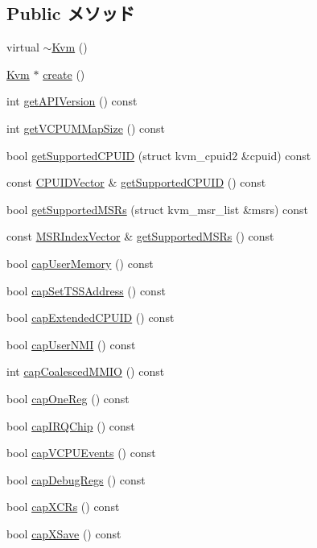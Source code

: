 \subsection*{Public メソッド}
\begin{DoxyCompactItemize}
\item 
virtual \hyperlink{classKvm_af634ce04aefb47ce4de9d029a9bc0642}{$\sim$Kvm} ()
\item 
\hyperlink{classKvm}{Kvm} $\ast$ \hyperlink{classKvm_a5a41f15f5b11ddab46bb5622409aea52}{create} ()
\item 
int \hyperlink{classKvm_a5bbf835d489e2bd0242d5b3840aa1304}{getAPIVersion} () const 
\item 
int \hyperlink{classKvm_a554cb4dd3512dba2169997c9c804d4ec}{getVCPUMMapSize} () const 
\item 
bool \hyperlink{classKvm_a74bec0050eeeffd21d5f85cb929c802b}{getSupportedCPUID} (struct kvm\_\-cpuid2 \&cpuid) const 
\item 
const \hyperlink{classstd_1_1vector}{CPUIDVector} \& \hyperlink{classKvm_aa0fc800a2144e592218a484d24b94f0f}{getSupportedCPUID} () const 
\item 
bool \hyperlink{classKvm_a3ae50dd2ddc035995d7578481b35e877}{getSupportedMSRs} (struct kvm\_\-msr\_\-list \&msrs) const 
\item 
const \hyperlink{classstd_1_1vector}{MSRIndexVector} \& \hyperlink{classKvm_ab43b4ff4aabd353eef30f8defba2718d}{getSupportedMSRs} () const 
\end{DoxyCompactItemize}
\begin{Indent}{\bf }\par
{\em \label{_amgrpd41d8cd98f00b204e9800998ecf8427e}
 }\begin{DoxyCompactItemize}
\item 
bool \hyperlink{classKvm_a3f08fc1c466eca4129d52fa3b21023d1}{capUserMemory} () const 
\item 
bool \hyperlink{classKvm_a8bc7fe4f8395a54ef945822211a57228}{capSetTSSAddress} () const 
\item 
bool \hyperlink{classKvm_a6db5aefbe1a9535f5124ef07a04e23a5}{capExtendedCPUID} () const 
\item 
bool \hyperlink{classKvm_acf36e247bf7857c1c7b1e260eff7f7db}{capUserNMI} () const 
\item 
int \hyperlink{classKvm_a23013f2d078b52428edae7ecfb6b5b7b}{capCoalescedMMIO} () const 
\item 
bool \hyperlink{classKvm_af1ad3b73711f45008bcb240d012987f7}{capOneReg} () const 
\item 
bool \hyperlink{classKvm_ab3e6d2bb7ea83c6cdc20369bf3a274a6}{capIRQChip} () const 
\item 
bool \hyperlink{classKvm_a75f29a9991c1117d5182abfb23bfbc92}{capVCPUEvents} () const 
\item 
bool \hyperlink{classKvm_a4e15b92a17300f1d37ceca6e4a984086}{capDebugRegs} () const 
\item 
bool \hyperlink{classKvm_aa9b34836edde016c16df3006fb33b0a9}{capXCRs} () const 
\item 
bool \hyperlink{classKvm_a9c6bbe65d43e3f2708723fc21f00b4cd}{capXSave} () const 
\end{DoxyCompactItemize}
\end{Indent}
